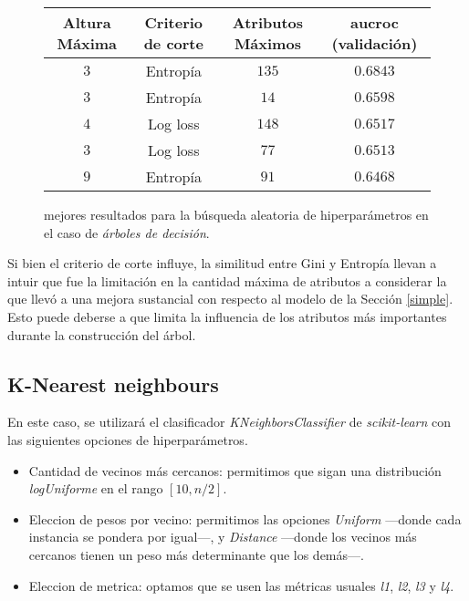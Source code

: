 \vspace{0.5em}
\begin{figure}[!htbp]
    \begin{center}
        \begin{tabular}{ |c|c|c|c| } 
         \hline
        Altura Máxima   & Criterio de corte & Atributos Máximos  & aucroc (validación) \\
        \hline
        $3$             & Entropía          &  $135$            & $0.6843$  \\ 
        $3$             & Entropía          &  $14$             & $0.6598$  \\
        $4$             & Log loss          &  $148$            & $0.6517$  \\ 
        $3$             & Log loss          &  $77$             & $0.6513$  \\
        $9$             & Entropía          &  $91$             & $0.6468$  \\ 
        \hline
        \end{tabular}
    \end{center}
    \caption{mejores resultados para la búsqueda aleatoria de hiperparámetros en el caso de \textit{árboles de decisión}.} \label{random_tree}
\end{figure}

Si bien el criterio de corte influye, la similitud entre Gini y Entropía llevan a intuir que fue la limitación en la cantidad máxima de atributos a considerar la que llevó a una mejora sustancial con respecto al modelo de la Sección \ref{simple}. Esto puede deberse a que limita la influencia de los atributos más importantes durante la construcción del árbol.

\subsection{K-Nearest neighbours}
En este caso, se utilizará el clasificador \textit{KNeighborsClassifier} de \textit{scikit-learn} con las siguientes opciones de hiperparámetros.

\begin{itemize}
    \item Cantidad de vecinos más cercanos: permitimos que sigan una distribución \textit{logUniforme} en el rango $[10, n/2]$.
    \item Eleccion de pesos por vecino: permitimos las opciones \textit{Uniform} ---donde cada instancia se pondera por igual---, y \textit{Distance} ---donde los vecinos más cercanos tienen un peso más determinante que los demás---.
    \item Eleccion de metrica: optamos que se usen las métricas usuales \textit{l1}, \textit{l2}, \textit{l3} y \textit{l4}. 
\end{itemize}

